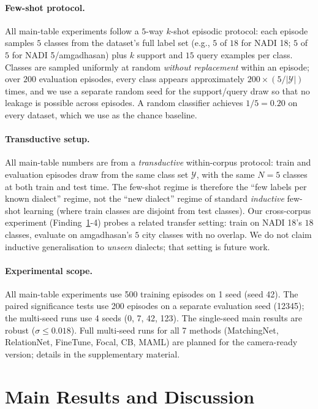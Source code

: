 \documentclass[11pt]{article}
\begin{document}
\paragraph{Few-shot protocol.} All main-table experiments
follow a $5$-way $k$-shot episodic protocol: each episode
samples $5$ classes from the dataset's full label set (e.g.,
$5$ of $18$ for NADI 18; $5$ of $5$ for NADI 5/amgadhasan)
plus $k$ support and $15$ query examples per class. Classes
are sampled uniformly at random \emph{without replacement}
within an episode; over $200$ evaluation episodes, every
class appears approximately $200{\times}(5/|\mathcal{Y}|)$
times, and we use a separate random seed for the support/query
draw so that no leakage is possible across episodes. A random
classifier achieves $1/5=0.20$ on every dataset, which we
use as the chance baseline.

\paragraph{Transductive setup.} All main-table numbers
are from a \emph{transductive} within-corpus protocol:
train and evaluation episodes draw from the same class
set $\mathcal{Y}$, with the same $N{=}5$ classes at both
train and test time. The few-shot regime is therefore the
``few labels per known dialect'' regime, not the ``new
dialect'' regime of standard \emph{inductive} few-shot
learning (where train classes are disjoint from test
classes). Our cross-corpus experiment
(Finding~\ref{sec:results}-4) probes a related transfer
setting: train on NADI 18's $18$ classes, evaluate on
amgadhasan's $5$ city classes with no overlap. We do not
claim inductive generalisation to \emph{unseen} dialects;
that setting is future work.

\paragraph{Experimental scope.}
All main-table experiments use 500 training episodes on 1 seed
(seed 42). The paired significance tests use 200 episodes on a
separate evaluation seed (12345); the multi-seed runs use 4 seeds
(0, 7, 42, 123). The single-seed main results are robust
($\sigma \le 0.018$). Full multi-seed runs for all
7 methods (MatchingNet, RelationNet, FineTune, Focal, CB, MAML)
are planned for the camera-ready version; details in the
supplementary material.

\section{Main Results and Discussion}
\label{sec:results}
\end{document}
